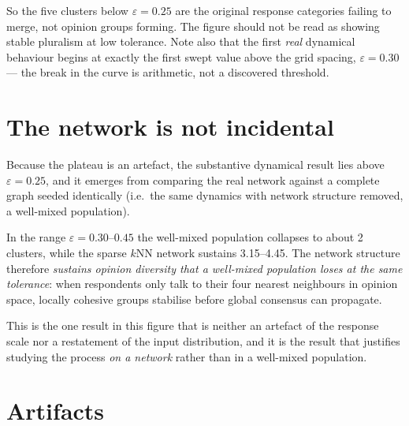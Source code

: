 \documentclass[11pt]{article}
\begin{document}
So the five clusters below $\varepsilon = 0.25$ are the original response
categories failing to merge, not opinion groups forming. The figure should not
be read as showing stable pluralism at low tolerance. Note also that the
first \emph{real} dynamical behaviour begins at exactly the first swept value
above the grid spacing, $\varepsilon = 0.30$ --- the break in the curve is
arithmetic, not a discovered threshold.

\section{The network is not incidental}

Because the plateau is an artefact, the substantive dynamical result lies
above $\varepsilon = 0.25$, and it emerges from comparing the real network
against a complete graph seeded identically (i.e.\ the same dynamics with
network structure removed, a well-mixed population).

In the range $\varepsilon = 0.30$--$0.45$ the well-mixed population collapses
to about 2 clusters, while the sparse $k$NN network sustains 3.15--4.45. The
network structure therefore \emph{sustains opinion diversity that a well-mixed
population loses at the same tolerance}: when respondents only talk to their
four nearest neighbours in opinion space, locally cohesive groups stabilise
before global consensus can propagate.

This is the one result in this figure that is neither an artefact of the
response scale nor a restatement of the input distribution, and it is the
result that justifies studying the process \emph{on a network} rather than in
a well-mixed population.

\section{Artifacts}
\end{document}
